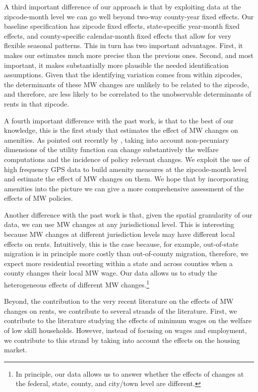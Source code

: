 \documentclass{article}
\begin{document}
A third important difference of our approach is that by exploiting data at the zipcode-month level we can go well beyond two-way county-year fixed effects. Our baseline specification has zipcode fixed effects, state-specific year-month fixed effects, and county-specific calendar-month fixed effects that allow for very flexible seasonal patterns. This in turn has two important advantages. First, it makes our estimates much more precise than the previous ones. Second, and most important, it makes substantially more plausible the needed identification assumptions. Given that the identifying variation comes from within zipcodes, the determinants of these MW changes are unlikely to be related to the zipcode, and therefore, are less likely to be correlated to the unobservable determinants of rents in that zipcode.

A fourth important difference with the past work, is that to the best of our knowledge, this is the first study that estimates the effect of MW changes on amenities. As pointed out recently by \textcite{diamond2016determinants, almagro2019location}, taking into account non-pecuniary dimensions of the utility function can change substantively the welfare computations and the incidence of policy relevant changes. We exploit the use of high frequency GPS data to build amenity measures at the zipcode-month level and estimate the effect of MW changes on them. We hope that by incorporating amenities into the picture we can give a more comprehensive assessment of the effects of MW policies.

Another difference with the past work is that, given the spatial granularity of our data, we can use MW changes at any jurisdictional level. This is interesting because MW changes at different jurisdiction levels may have different local effects on rents. Intuitively, this is the case because, for example, out-of-state migration is in principle more costly than out-of-county migration, therefore, we expect more residential resorting within a state and across counties when a county changes their local MW wage. Our data allows us to study the heterogeneous effects of different MW changes.\footnote{In principle, our data allows us to answer whether the effects of changes at the federal, state, county, and city/town level are different.} 

Beyond, the contribution to the very recent literature on the effects of MW changes on rents, we contribute to several strands of the literature. First, we contribute to the literature studying the effects of minimum wages on the welfare of low skill households. However, instead of focusing on wages and employment\parencite{dinardo1995labor, autor2016contribution, card2000minimum, neumark2006minimum, jardim2017minimum}, we contribute to this strand by taking into account the effects on the housing market.
\end{document}
